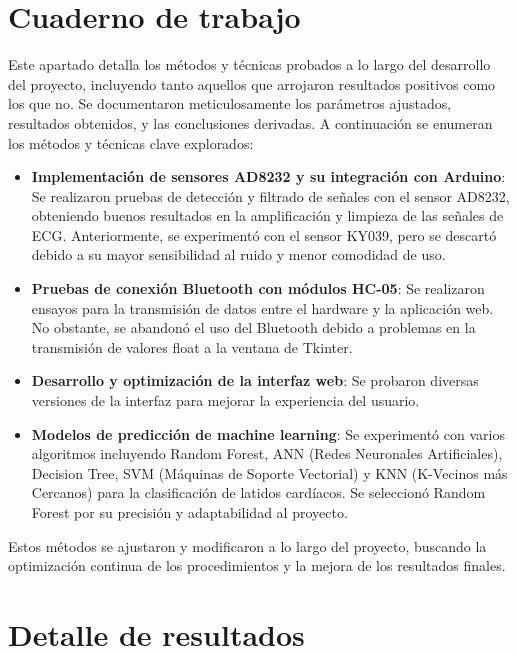 
\section{Cuaderno de trabajo}

Este apartado detalla los métodos y técnicas probados a lo largo del desarrollo del proyecto, incluyendo tanto aquellos que arrojaron resultados positivos como los que no. Se documentaron meticulosamente los parámetros ajustados, resultados obtenidos, y las conclusiones derivadas. A continuación se enumeran los métodos y técnicas clave explorados:

\begin{itemize}
\item \textbf{Implementación de sensores AD8232 y su integración con Arduino}: Se realizaron pruebas de detección y filtrado de señales con el sensor AD8232, obteniendo buenos resultados en la amplificación y limpieza de las señales de ECG. Anteriormente, se experimentó con el sensor KY039, pero se descartó debido a su mayor sensibilidad al ruido y menor comodidad de uso.
\item \textbf{Pruebas de conexión Bluetooth con módulos HC-05}: Se realizaron ensayos para la transmisión de datos entre el hardware y la aplicación web. No obstante, se abandonó el uso del Bluetooth debido a problemas en la transmisión de valores float a la ventana de Tkinter.
\item \textbf{Desarrollo y optimización de la interfaz web}: Se probaron diversas versiones de la interfaz para mejorar la experiencia del usuario.
\item \textbf{Modelos de predicción de machine learning}: Se experimentó con varios algoritmos incluyendo Random Forest, ANN (Redes Neuronales Artificiales), Decision Tree, SVM (Máquinas de Soporte Vectorial) y KNN (K-Vecinos más Cercanos) para la clasificación de latidos cardíacos. Se seleccionó Random Forest por su precisión y adaptabilidad al proyecto.
\end{itemize}

Estos métodos se ajustaron y modificaron a lo largo del proyecto, buscando la optimización continua de los procedimientos y la mejora de los resultados finales.

\section{Detalle de resultados}

